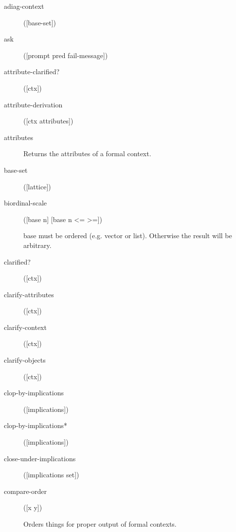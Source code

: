 \begin{description}
  \item[adiag-context]
([base-set])



  \item[ask]
([prompt pred fail-message])



  \item[attribute-clarified?]
([ctx])



  \item[attribute-derivation]
([ctx attributes])



  \item[attributes]


Returns the attributes of a formal context.

  \item[base-set]
([lattice])



  \item[biordinal-scale]
([base n] [base n <= >=])

base must be ordered (e.g. vector or list). Otherwise the result will be arbitrary.

  \item[clarified?]
([ctx])



  \item[clarify-attributes]
([ctx])



  \item[clarify-context]
([ctx])



  \item[clarify-objects]
([ctx])



  \item[clop-by-implications]
([implications])



  \item[clop-by-implications*]
([implications])



  \item[close-under-implications]
([implications set])



  \item[compare-order]
([x y])

Orders things for proper output of formal contexts.


\end{description}
